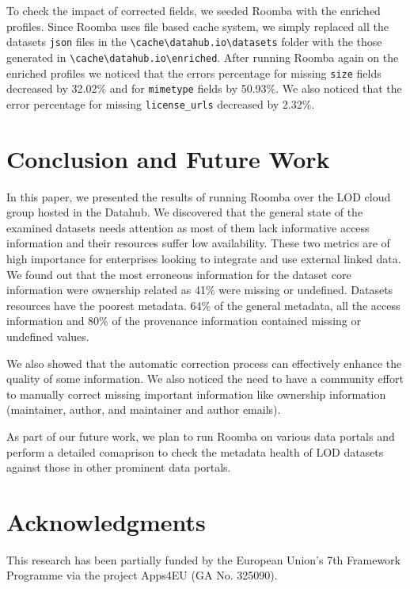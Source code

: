 \documentclass[runningheads,a4paper]{llncs}
\begin{document}
To check the impact of corrected fields, we seeded Roomba with the enriched profiles. Since Roomba uses file based cache system, we simply replaced all the datasets \texttt{json} files in the \texttt{\textbackslash cache\textbackslash datahub.io\textbackslash datasets} folder with the those generated in \texttt{\textbackslash cache\textbackslash datahub.io\textbackslash enriched}. After running Roomba again on the enriched profiles we noticed that the errors percentage for missing \texttt{size} fields decreased by 32.02\% and for \texttt{mimetype} fields by 50.93\%. We also noticed that the error percentage for missing \texttt{license\_urls} decreased by 2.32\%.

\section{Conclusion and Future Work}
\label{sec:conclusion}

In this paper, we presented the results of running Roomba over the LOD cloud group hosted in the Datahub. We discovered that the general state of the examined datasets needs attention as most of them lack informative access information and their resources suffer low availability. These two metrics are of high importance for enterprises looking to integrate and use external linked data. We found out that the most erroneous information for the dataset core information were ownership related as 41\% were missing or undefined. Datasets resources have the poorest metadata. 64\% of the general metadata, all the access information and 80\% of the provenance information contained missing or undefined values.

We also showed that the automatic correction process can effectively enhance the quality of some information. We also noticed the need to have a community effort to manually correct missing important information like ownership information (maintainer, author, and maintainer and author emails).

As part of our future work, we plan to run Roomba on various data portals and perform a detailed comaprison to check the metadata health of LOD datasets against those in other prominent data portals.


\section*{Acknowledgments}
This research has been partially funded by the European Union's 7th Framework Programme via the project Apps4EU (GA No. 325090).
\vspace{0.5cm}


\nocite{*}

\end{document}
